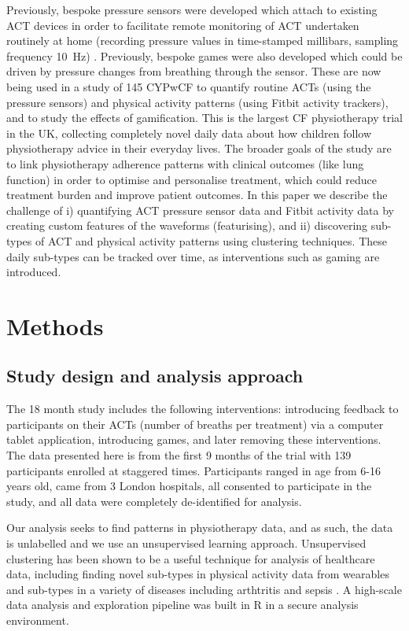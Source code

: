 \documentclass{article}
\begin{document}
Previously, bespoke pressure sensors were developed which attach to existing ACT devices in order to facilitate remote monitoring of ACT undertaken routinely at home (recording pressure values in time-stamped millibars, sampling frequency 10~Hz) \cite{Zhang}. Previously, bespoke games were also developed which could be driven by pressure changes from breathing through the sensor. These are now being used in a study of 145 CYPwCF \cite{HelenDouglas2018} to quantify routine ACTs (using the pressure sensors) and physical activity patterns (using Fitbit activity trackers), and to study the effects of gamification. This is the largest CF physiotherapy trial in the UK, collecting completely novel daily data about how children follow physiotherapy advice in their everyday lives. The broader goals of the study are to link physiotherapy adherence patterns with clinical outcomes (like lung function) in order to optimise and personalise treatment, which could reduce treatment burden and improve patient outcomes. In this paper we describe the challenge of i) quantifying ACT pressure sensor data and Fitbit activity data by creating custom features of the waveforms (featurising), and ii) discovering sub-types of ACT and physical activity patterns using clustering techniques. These daily sub-types can be tracked over time, as interventions such as gaming are introduced.  
 
\section{Methods}

\subsection{Study design and analysis approach}

The 18 month study \cite{HelenDouglas2018} includes the following interventions: introducing feedback to participants on their ACTs (number of breaths per treatment) via a computer tablet application, introducing games, and later removing these interventions. The data presented here is from the first 9 months of the trial with 139 participants enrolled at staggered times. Participants ranged in age from 6-16 years old, came from 3 London hospitals, all consented to participate in the study, and all data were completely de-identified for analysis.
 
Our analysis seeks to find patterns in physiotherapy data, and as such, the data is unlabelled and we use an unsupervised learning approach. Unsupervised clustering has been shown to be a useful technique for analysis of healthcare data, including finding novel sub-types in physical activity data from wearables \cite{physical_activity_patterns_2017} and sub-types in a variety of diseases including arthtritis \cite{Eng2019} and sepsis \cite{Seymour2019}. A high-scale data analysis and exploration pipeline was built in R in a secure analysis environment.  
\end{document}
